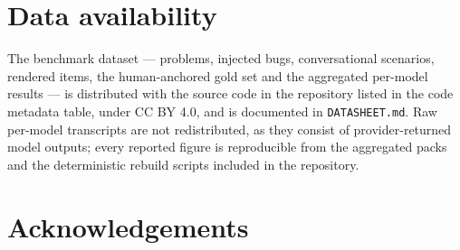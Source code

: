 \documentclass[preprint,12pt, a4paper]{elsarticle}
\begin{document}

\section*{Data availability}
\label{sec:dataavailability}

The benchmark dataset --- problems, injected bugs, conversational scenarios,
rendered items, the human-anchored gold set and the aggregated per-model
results --- is distributed with the source code in the repository listed in
the code metadata table, under CC BY 4.0, and is documented in
\texttt{DATASHEET.md}. Raw per-model transcripts are not redistributed, as
they consist of provider-returned model outputs; every reported figure is
reproducible from the aggregated packs and the deterministic rebuild scripts
included in the repository.

\section*{Acknowledgements}
\end{document}
